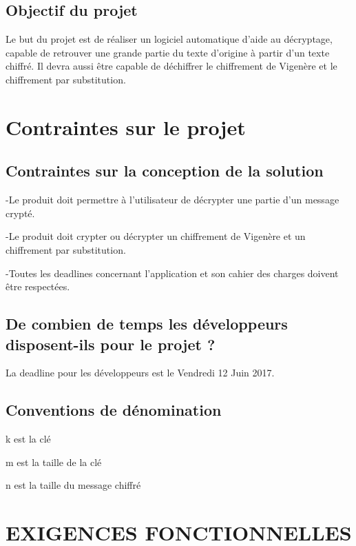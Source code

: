 \documentclass[a4]{article}
\begin{document}
			\subsection{Objectif du projet}
				Le but du projet est de réaliser un logiciel automatique d'aide au décryptage, capable de retrouver une grande partie du texte d'origine à partir d'un texte chiffré. Il devra aussi être capable de déchiffrer le chiffrement de Vigenère et le chiffrement par substitution.
\section{Contraintes sur le projet}
			\subsection{Contraintes sur la conception de la solution}
				-Le produit doit permettre à l'utilisateur de décrypter une partie d'un message crypté.

				-Le produit doit crypter ou décrypter un chiffrement de Vigenère et un chiffrement par substitution.

				-Toutes les deadlines concernant l'application et son cahier des charges doivent être respectées.
			\subsection{ De combien de temps les développeurs disposent-ils pour le projet ?}
				La deadline pour les développeurs est le Vendredi 12 Juin 2017.
		\subsection{Conventions de dénomination}
		
			k est la clé

			m est la taille de la clé

			n est la taille du message chiffré

	\section{EXIGENCES FONCTIONNELLES}
\end{document}
